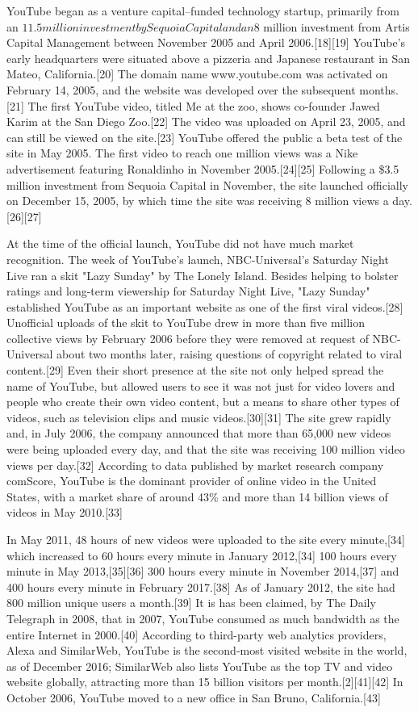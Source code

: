 \documentclass[12pt]{article}
\begin{document}
YouTube began as a venture capital–funded technology startup, primarily from an $11.5 million investment by Sequoia Capital and an $8 million investment from Artis Capital Management between November 2005 and April 2006.[18][19] YouTube's early headquarters were situated above a pizzeria and Japanese restaurant in San Mateo, California.[20] The domain name www.youtube.com was activated on February 14, 2005, and the website was developed over the subsequent months.[21] The first YouTube video, titled Me at the zoo, shows co-founder Jawed Karim at the San Diego Zoo.[22] The video was uploaded on April 23, 2005, and can still be viewed on the site.[23] YouTube offered the public a beta test of the site in May 2005. The first video to reach one million views was a Nike advertisement featuring Ronaldinho in November 2005.[24][25] Following a \$3.5 million investment from Sequoia Capital in November, the site launched officially on December 15, 2005, by which time the site was receiving 8 million views a day.[26][27]

At the time of the official launch, YouTube did not have much market recognition. The week of YouTube's launch, NBC-Universal's Saturday Night Live ran a skit "Lazy Sunday" by The Lonely Island. Besides helping to bolster ratings and long-term viewership for Saturday Night Live, "Lazy Sunday" established YouTube as an important website as one of the first viral videos.[28] Unofficial uploads of the skit to YouTube drew in more than five million collective views by February 2006 before they were removed at request of NBC-Universal about two months later, raising questions of copyright related to viral content.[29] Even their short presence at the site not only helped spread the name of YouTube, but allowed users to see it was not just for video lovers and people who create their own video content, but a means to share other types of videos, such as television clips and music videos.[30][31] The site grew rapidly and, in July 2006, the company announced that more than 65,000 new videos were being uploaded every day, and that the site was receiving 100 million video views per day.[32] According to data published by market research company comScore, YouTube is the dominant provider of online video in the United States, with a market share of around 43\% and more than 14 billion views of videos in May 2010.[33]

In May 2011, 48 hours of new videos were uploaded to the site every minute,[34] which increased to 60 hours every minute in January 2012,[34] 100 hours every minute in May 2013,[35][36] 300 hours every minute in November 2014,[37] and 400 hours every minute in February 2017.[38] As of January 2012, the site had 800 million unique users a month.[39] It is has been claimed, by The Daily Telegraph in 2008, that in 2007, YouTube consumed as much bandwidth as the entire Internet in 2000.[40] According to third-party web analytics providers, Alexa and SimilarWeb, YouTube is the second-most visited website in the world, as of December 2016; SimilarWeb also lists YouTube as the top TV and video website globally, attracting more than 15 billion visitors per month.[2][41][42] In October 2006, YouTube moved to a new office in San Bruno, California.[43]
\end{document}
